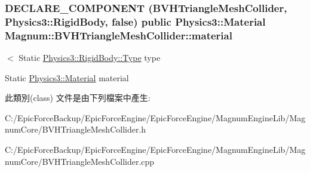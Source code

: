 \subsubsection[{\texorpdfstring{material}{material}}]{\setlength{\rightskip}{0pt plus 5cm}D\+E\+C\+L\+A\+R\+E\+\_\+\+C\+O\+M\+P\+O\+N\+E\+NT ({\bf B\+V\+H\+Triangle\+Mesh\+Collider}, {\bf Physics3\+::\+Rigid\+Body}, false) public {\bf Physics3\+::\+Material} Magnum\+::\+B\+V\+H\+Triangle\+Mesh\+Collider\+::material}\hypertarget{class_magnum_1_1_b_v_h_triangle_mesh_collider_a9fb1ae5c2eb00184fd1601ee6203d987}{}\label{class_magnum_1_1_b_v_h_triangle_mesh_collider_a9fb1ae5c2eb00184fd1601ee6203d987}


$<$ Static \hyperlink{class_magnum_1_1_physics3_1_1_rigid_body_a429aa4fb7256b083334c86cdcd0d6b31}{Physics3\+::\+Rigid\+Body\+::\+Type} type 

Static \hyperlink{class_magnum_1_1_physics3_1_1_material}{Physics3\+::\+Material} material 

此類別(class) 文件是由下列檔案中產生\+:\begin{DoxyCompactItemize}
\item 
C\+:/\+Epic\+Force\+Backup/\+Epic\+Force\+Engine/\+Epic\+Force\+Engine/\+Magnum\+Engine\+Lib/\+Magnum\+Core/B\+V\+H\+Triangle\+Mesh\+Collider.\+h\item 
C\+:/\+Epic\+Force\+Backup/\+Epic\+Force\+Engine/\+Epic\+Force\+Engine/\+Magnum\+Engine\+Lib/\+Magnum\+Core/B\+V\+H\+Triangle\+Mesh\+Collider.\+cpp\end{DoxyCompactItemize}
